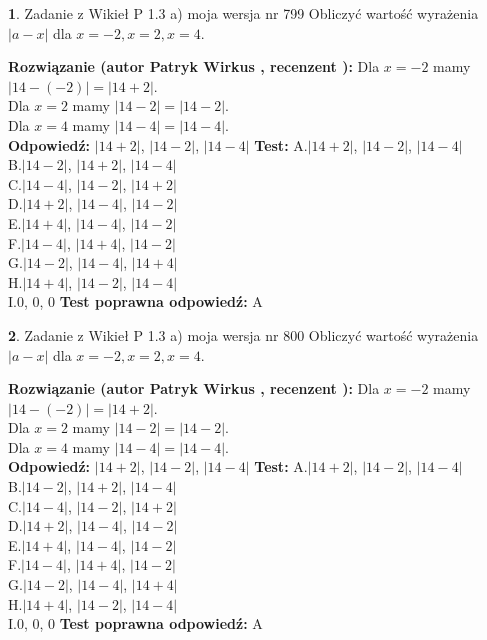 \documentclass[12pt, a4paper]{article}
\theoremstyle{definition} %
\newtheorem{zad}{}
\newcommand{\zadStart}[1]{\begin{zad}#1\newline}
\newcommand{\zadStop}{\end{zad}}
\newcommand{\rozwStart}[2]{\noindent \textbf{Rozwiązanie (autor #1 , recenzent #2): }\newline}
\newcommand{\rozwStop}{\newline}
\newcommand{\odpStart}{\noindent \textbf{Odpowiedź:}\newline}
\newcommand{\odpStop}{\newline}
\newcommand{\testStart}{\noindent \textbf{Test:}\newline}
\newcommand{\testStop}{\newline}
\newcommand{\kluczStart}{\noindent \textbf{Test poprawna odpowiedź:}\newline}
\newcommand{\kluczStop}{\newline}
\begin{document}
\zadStart{Zadanie z Wikieł P 1.3 a) moja wersja nr 799}
Obliczyć wartość wyrażenia $|a - x|$ dla $x=-2,x=2,x=4$.
\zadStop
\rozwStart{Patryk Wirkus}{}
Dla $x = -2$ mamy $|14 - (-2)| = |14 + 2|$.\\
Dla $x = 2$ mamy $|14 - 2| = |14 - 2|$.\\
Dla $x = 4$ mamy $|14 - 4| = |14 - 4|$.\\
\rozwStop
\odpStart
$|14 + 2|$, $|14 - 2|$, $|14 - 4|$
\odpStop
\testStart
A.$|14 + 2|$, $|14 - 2|$, $|14 - 4|$\\
B.$|14 - 2|$, $|14 + 2|$, $|14 - 4|$\\
C.$|14 - 4|$, $|14 - 2|$, $|14 + 2|$\\
D.$|14 + 2|$, $|14 - 4|$, $|14 - 2|$\\
E.$|14 + 4|$, $|14 - 4|$, $|14 - 2|$\\
F.$|14 - 4|$, $|14 + 4|$, $|14 - 2|$\\
G.$|14 - 2|$, $|14 - 4|$, $|14 + 4|$\\
H.$|14 + 4|$, $|14 - 2|$, $|14 - 4|$\\
I.$0$, $0$, $0$
\testStop
\kluczStart
A
\kluczStop



\zadStart{Zadanie z Wikieł P 1.3 a) moja wersja nr 800}
Obliczyć wartość wyrażenia $|a - x|$ dla $x=-2,x=2,x=4$.
\zadStop
\rozwStart{Patryk Wirkus}{}
Dla $x = -2$ mamy $|14 - (-2)| = |14 + 2|$.\\
Dla $x = 2$ mamy $|14 - 2| = |14 - 2|$.\\
Dla $x = 4$ mamy $|14 - 4| = |14 - 4|$.\\
\rozwStop
\odpStart
$|14 + 2|$, $|14 - 2|$, $|14 - 4|$
\odpStop
\testStart
A.$|14 + 2|$, $|14 - 2|$, $|14 - 4|$\\
B.$|14 - 2|$, $|14 + 2|$, $|14 - 4|$\\
C.$|14 - 4|$, $|14 - 2|$, $|14 + 2|$\\
D.$|14 + 2|$, $|14 - 4|$, $|14 - 2|$\\
E.$|14 + 4|$, $|14 - 4|$, $|14 - 2|$\\
F.$|14 - 4|$, $|14 + 4|$, $|14 - 2|$\\
G.$|14 - 2|$, $|14 - 4|$, $|14 + 4|$\\
H.$|14 + 4|$, $|14 - 2|$, $|14 - 4|$\\
I.$0$, $0$, $0$
\testStop
\kluczStart
A
\kluczStop
\end{document}
